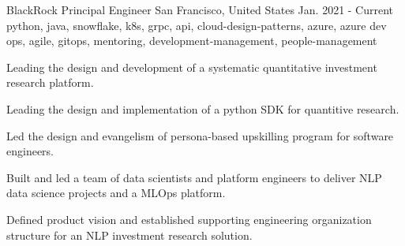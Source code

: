 \cventry
    {BlackRock} %
    {Principal Engineer} %
    {San Francisco, United States} %
    {Jan. 2021 - Current} %
    { python, java, snowflake, k8s, grpc, api, cloud-design-patterns, azure, azure dev ops, agile, gitops, mentoring, development-management, people-management} %
    {
    \begin{cvitems} %
       \item { Leading the design and development of a systematic quantitative investment research platform. }
       \item { Leading the design and implementation of a python SDK for quantitive research. }
       \item { Led the design and evangelism of persona-based upskilling program for software engineers. }
       \item { Built and led a team of data scientists and platform engineers to deliver NLP data science projects and a MLOps platform. }
       \item { Defined product vision and established supporting engineering organization structure for an NLP investment research solution. }
    \end{cvitems}
    }

